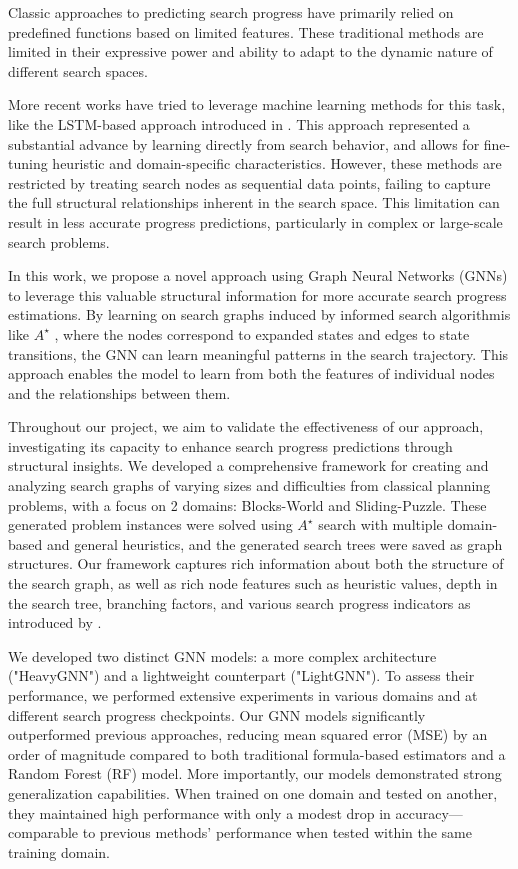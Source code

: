 \documentclass[letterpaper]{article}
\begin{document}
Classic approaches to predicting search progress have primarily relied on predefined functions based on limited features. These traditional methods are limited in their expressive power and ability to adapt to the dynamic nature of different search spaces.

More recent works have tried to leverage machine learning methods for this task, like the LSTM-based approach introduced in \citet{sudry2022learning}. This approach represented a substantial advance by learning directly from search behavior, and allows for fine-tuning heuristic and domain-specific characteristics. However, these methods are restricted by treating search nodes as sequential data points, failing to capture the full structural relationships inherent in the search space. This limitation can result in less accurate progress predictions, particularly in complex or large-scale search problems.

In this work, we propose a novel approach using Graph Neural Networks (GNNs) to leverage this valuable structural information for more accurate search progress estimations. By learning on search graphs induced by informed search algorithmis like $A^{\star}$ \citep{hart1968formal}, where the nodes correspond to expanded states and edges to state transitions, the GNN can learn meaningful patterns in the search trajectory. This approach enables the model to learn from both the features of individual nodes and the relationships between them.

Throughout our project, we aim to validate the effectiveness of our approach, investigating its capacity to enhance search progress predictions through structural insights. We developed a comprehensive framework for creating and analyzing search graphs of varying sizes and difficulties from classical planning problems, with a focus on 2 domains: Blocks-World and Sliding-Puzzle. These generated problem instances were solved using $A^{\star}$ search with multiple domain-based and general heuristics, and the generated search trees were saved as graph structures. Our framework captures rich information about both the structure of the search graph, as well as rich node features such as heuristic values, depth in the search tree, branching factors, and various search progress indicators as introduced by \citet{sudry2022learning}.

We developed two distinct GNN models: a more complex architecture ("HeavyGNN") and a lightweight counterpart ("LightGNN"). To assess their performance, we performed extensive experiments in various domains and at different search progress checkpoints. Our GNN models significantly outperformed previous approaches, reducing mean squared error (MSE) by an order of magnitude compared to both traditional formula-based estimators and a Random Forest (RF) model. More importantly, our models demonstrated strong generalization capabilities. When trained on one domain and tested on another, they maintained high performance with only a modest drop in accuracy—comparable to previous methods' performance when tested within the same training domain.
\end{document}

